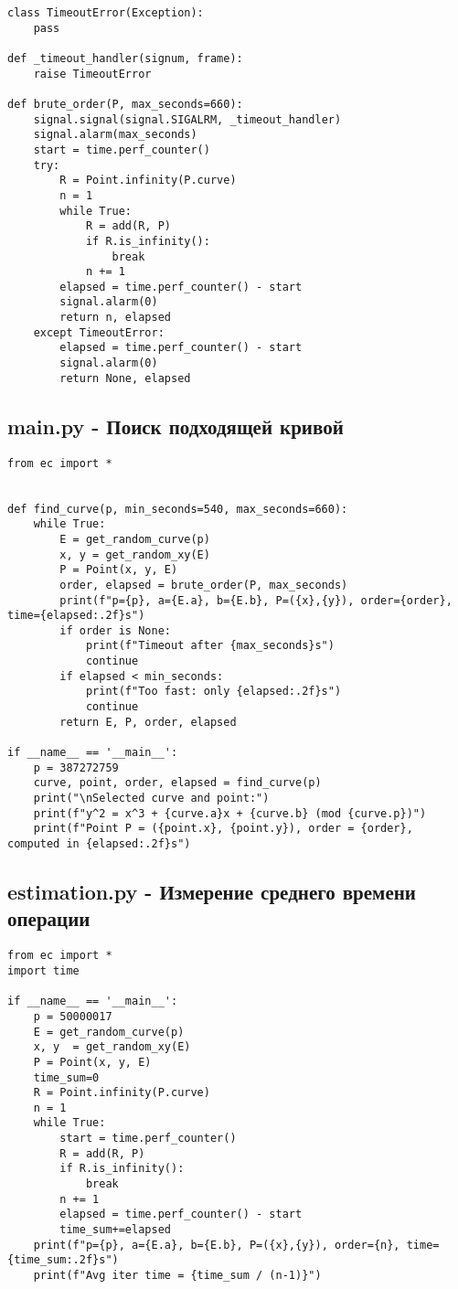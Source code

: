 \documentclass[a4paper,12pt]{article}
\begin{document}
\begin{lstlisting}
class TimeoutError(Exception):
    pass

def _timeout_handler(signum, frame):
    raise TimeoutError
    
def brute_order(P, max_seconds=660):
    signal.signal(signal.SIGALRM, _timeout_handler)
    signal.alarm(max_seconds)
    start = time.perf_counter()
    try:
        R = Point.infinity(P.curve)
        n = 1
        while True:
            R = add(R, P)
            if R.is_infinity():
                break
            n += 1
        elapsed = time.perf_counter() - start
        signal.alarm(0)
        return n, elapsed
    except TimeoutError:
        elapsed = time.perf_counter() - start
        signal.alarm(0)
        return None, elapsed
\end{lstlisting}

\subsection{main.py - Поиск подходящей кривой}
\begin{lstlisting}
from ec import *


def find_curve(p, min_seconds=540, max_seconds=660):
    while True:
        E = get_random_curve(p)
        x, y = get_random_xy(E)
        P = Point(x, y, E)
        order, elapsed = brute_order(P, max_seconds)
        print(f"p={p}, a={E.a}, b={E.b}, P=({x},{y}), order={order}, time={elapsed:.2f}s")
        if order is None:
            print(f"Timeout after {max_seconds}s")
            continue
        if elapsed < min_seconds:
            print(f"Too fast: only {elapsed:.2f}s")
            continue
        return E, P, order, elapsed

if __name__ == '__main__':
    p = 387272759
    curve, point, order, elapsed = find_curve(p)
    print("\nSelected curve and point:")
    print(f"y^2 = x^3 + {curve.a}x + {curve.b} (mod {curve.p})")
    print(f"Point P = ({point.x}, {point.y}), order = {order}, computed in {elapsed:.2f}s")
\end{lstlisting}

\subsection{estimation.py - Измерение среднего времени операции}
\begin{lstlisting}
from ec import *
import time

if __name__ == '__main__':
    p = 50000017
    E = get_random_curve(p)
    x, y  = get_random_xy(E)
    P = Point(x, y, E)
    time_sum=0
    R = Point.infinity(P.curve)
    n = 1
    while True:
        start = time.perf_counter()
        R = add(R, P)
        if R.is_infinity():
            break
        n += 1
        elapsed = time.perf_counter() - start
        time_sum+=elapsed
    print(f"p={p}, a={E.a}, b={E.b}, P=({x},{y}), order={n}, time={time_sum:.2f}s")
    print(f"Avg iter time = {time_sum / (n-1)}")
\end{lstlisting}
\end{document}
